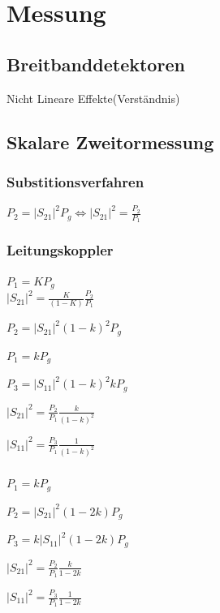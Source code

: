 \section{Messung}
\renewcommand{\ort}{topics/Messung}


\subsection{Breitbanddetektoren}

Nicht Lineare Effekte(Verständnis)


\subsection{Skalare Zweitormessung}

\subsubsection{Substitionsverfahren}
$P_2 = \lvert S_{21}\rvert^2 P_g \Leftrightarrow  \lvert S_{21}\rvert^2 = \frac{P_2}{P_1}$

\subsubsection{Leitungskoppler}
$P_1 = K P_g$\\
$\lvert S_{21}\rvert^2 = \frac{K}{(1 - K)}\frac{P_2}{P_1}$


\begin{pitemize}
    \item $P_2 = \lvert S_{21}\rvert^2 (1-k)^2 P_g$
    \item $P_1 = k P_g$
    \item $P_3 = \lvert S_{11}\rvert^2 (1-k)^2 k P_g$
    \item $\lvert S_{21}\rvert^2 = \frac{P_2}{P_1}\frac{k}{(1-k)^2}$
    \item $\lvert S_{11}\rvert^2 = \frac{P_3}{P_1}\frac{1}{(1-k)^2}$
\end{pitemize}


\subsubsection{}

\begin{pitemize}
    \item $P_1 = k P_g$
    \item $P_2 = \lvert S_{21}\rvert^2 (1-2k) P_g$
    \item $P_3 = k \lvert S_{11}\rvert^2 (1-2k) P_g$
    \item $\lvert S_{21}\rvert^2 = \frac{P_2}{P_1} \frac{k}{1-2k}$
    \item $\lvert S_{11}\rvert^2 = \frac{P_3}{P_1} \frac{1}{1-2k}$
\end{pitemize}




